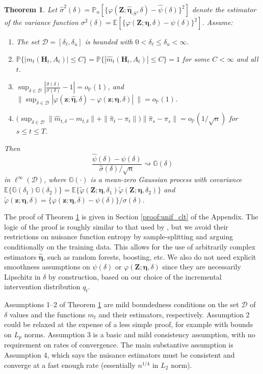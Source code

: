 \documentclass[12pt]{article}
\def\indist{\rightsquigarrow}
\newcommand{\Pb}{\mathbb{P}}
\newcommand{\Pn}{\mathbb{P}_n}
\newcommand{\Gb}{\mathbb{G}}
\newcommand{\E}{\mathbb{E}}
\newcommand{\bZ}{\mathbf{Z}}
\newcommand{\bz}{\mathbf{z}}
\newcommand{\bH}{\mathbf{H}}
\newtheorem{theorem}{Theorem}
\theoremstyle{remark}
\begin{document}
\begin{theorem}
\label{thm:unif_clt}
Let $\hat\sigma^2(\delta) = \Pn[\{\varphi(\bZ;\hat{\boldsymbol\eta}_{\text{-}S},\delta)-\hat\psi(\delta)\}^2]$ denote the estimator of the variance function $\sigma^2(\delta) = \E[\{\varphi(\bZ;\boldsymbol\eta,\delta)-\psi(\delta)\}^2]$. Assume: 
\begin{enumerate}
\item The set $\mathcal{D} =[\delta_\ell,\delta_u]$ is bounded with $0<\delta_\ell \leq \delta_u < \infty$.
\item $\Pb\{ |m_t(\bH_t,A_t) | \leq C\} =\Pb\{ |\hat{m}_t(\bH_t,A_t) | \leq C\} = 1$ for some $C < \infty$ and all $t$.
\item $\sup_{\delta \in \mathcal{D}} | \frac{\hat\sigma(\delta)}{\sigma(\delta)} - 1| = o_\Pb(1)$, and $\| \sup_{\delta \in \mathcal{D}} | \varphi(\bz; \hat{\boldsymbol\eta},\delta) - \varphi(\bz; \boldsymbol\eta,\delta)| \ \! \| = o_\Pb(1)$.
\item $\Big( \sup_{\delta \in \mathcal{D}}  \| \hat{m}_{t,\delta} - m_{t,\delta} \| + \| \hat\pi_t - \pi_t \| \Big) \| \hat\pi_s - \pi_s \| = o_\Pb(1/\sqrt{n})$ for $s \leq t \leq T$.
\end{enumerate}
Then
$$  \frac{ \hat\psi(\delta) - \psi(\delta) }{\hat\sigma(\delta) / \sqrt{n} }  \indist  \Gb(\delta)  $$
in $\ell^\infty(\mathcal{D})$, where $\Gb(\cdot)$ is a mean-zero Gaussian process with covariance  $\E\{\Gb(\delta_1) \Gb(\delta_2)\} = \E\{ \widetilde\varphi(\bZ;\boldsymbol\eta,\delta_1) \widetilde\varphi(\bZ;\boldsymbol\eta,\delta_2) \}$ and $\widetilde\varphi(\bz;\boldsymbol\eta,\delta)=\{\varphi(\bz;\boldsymbol\eta,\delta)-\psi(\delta)\}/\sigma(\delta)$.
\end{theorem}

The proof of Theorem \ref{thm:unif_clt} is given in Section \ref{proof:unif_clt} of the Appendix. The logic of the proof is roughly similar to that used by \textcite{belloni2015uniformly}, but we avoid their restrictions on nuisance function entropy by sample-splitting and arguing conditionally on the training data. This allows for the use of arbitrarily complex estimators $\hat{\boldsymbol\eta}$, such as random forests, boosting, etc.  We also do not need explicit smoothness assumptions on $\psi(\delta)$ or $\varphi(\bZ;\boldsymbol\eta, \delta)$ since they are necessarily Lipschitz in $\delta$ by construction, based on our choice of the incremental intervention distribution $q_t$.

Assumptions 1--2 of Theorem \ref{thm:unif_clt} are mild boundedness conditions on the set $\mathcal{D}$ of $\delta$ values and the functions $m_t$ and their estimators, respectively. Assumption 2 could be relaxed at the expense of a less simple proof, for example with bounds on $L_p$ norms. Assumption 3 is a basic and mild consistency assumption, with no requirement on rates of convergence. The main substantive assumption is Assumption 4, which says the nuisance estimators must be consistent and converge at a fast enough rate (essentially $n^{1/4}$ in $L_2$ norm).
\end{document}

